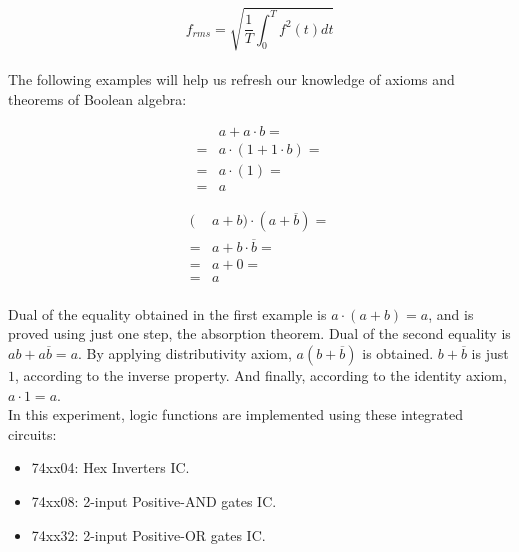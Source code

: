 \documentclass[pdftex,12pt,a4paper]{article}
\begin{document}
\[f_{rms} = \sqrt{\frac{1}{T} \int_{0}^{T} f^2(t) dt}\] \\

The following examples will help us refresh our knowledge of axioms and theorems of Boolean algebra:

\begin{align*}
& a + a \cdot b = \\
= & a \cdot (1 + 1 \cdot b) = \tag{Distributivity} \\
= & a \cdot (1) = \tag{Dominance} \\
= & a \tag{Identity axiom}
\end{align*}

\begin{align*}
  (&a+b) \cdot (a + \overline{b}) = \\
= & a + b \cdot \overline{b} = \tag{Distributivity} \\
= & a + 0 = \tag{Inverse axiom} \\
= & a \tag{Identity axiom} \\
\end{align*}

Dual of the equality obtained in the first example is $a \cdot (a+b) = a$, and is proved using just one step, the absorption theorem. Dual of the second equality is $ab + a\overline{b} = a$. By applying distributivity axiom, $a(b+\overline{b})$ is obtained. $b + \overline{b}$ is just $1$, according to the inverse property. And finally, according to the identity axiom, $a \cdot 1 = a$. \\ 

In this experiment, logic functions are implemented using these integrated circuits:
 \begin{itemize}
       \item 74xx04: Hex Inverters IC.
       \item 74xx08: 2-input Positive-AND gates IC.
       \item 74xx32: 2-input Positive-OR gates IC.
   \end{itemize}
\end{document}
